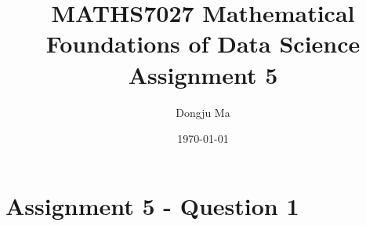 \documentclass{article}
\title{MATHS7027 Mathematical Foundations of Data Science Assignment 5}
\author{Dongju Ma}
\date{\today}
\begin{document}
\maketitle  %


\section*{Assignment 5 - Question 1}
\end{document}
